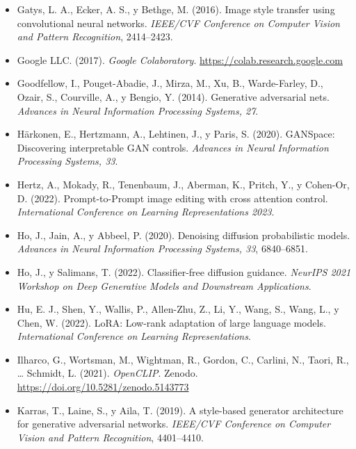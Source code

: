 \documentclass[12pt, a4paper, twoside]{book}
\begin{document}
\begin{itemize}[leftmargin=1.5em, itemsep=4pt]
\item Gatys, L. A., Ecker, A. S., y Bethge, M. (2016). Image style transfer using convolutional neural networks. \textit{IEEE/CVF Conference on Computer Vision and Pattern Recognition}, 2414--2423.

\item Google LLC. (2017). \textit{Google Colaboratory}. \url{https://colab.research.google.com}

\item Goodfellow, I., Pouget-Abadie, J., Mirza, M., Xu, B., Warde-Farley, D., Ozair, S., Courville, A., y Bengio, Y. (2014). Generative adversarial nets. \textit{Advances in Neural Information Processing Systems, 27}.

\item H{\"a}rkonen, E., Hertzmann, A., Lehtinen, J., y Paris, S. (2020). GANSpace: Discovering interpretable GAN controls. \textit{Advances in Neural Information Processing Systems, 33}.

\item Hertz, A., Mokady, R., Tenenbaum, J., Aberman, K., Pritch, Y., y Cohen-Or, D. (2022). Prompt-to-Prompt image editing with cross attention control. \textit{International Conference on Learning Representations 2023}.

\item Ho, J., Jain, A., y Abbeel, P. (2020). Denoising diffusion probabilistic models. \textit{Advances in Neural Information Processing Systems, 33}, 6840--6851.

\item Ho, J., y Salimans, T. (2022). Classifier-free diffusion guidance. \textit{NeurIPS 2021 Workshop on Deep Generative Models and Downstream Applications}.

\item Hu, E. J., Shen, Y., Wallis, P., Allen-Zhu, Z., Li, Y., Wang, S., Wang, L., y Chen, W. (2022). LoRA: Low-rank adaptation of large language models. \textit{International Conference on Learning Representations}.

\item Ilharco, G., Wortsman, M., Wightman, R., Gordon, C., Carlini, N., Taori, R., \ldots{} Schmidt, L. (2021). \textit{OpenCLIP}. Zenodo. \url{https://doi.org/10.5281/zenodo.5143773}

\item Karras, T., Laine, S., y Aila, T. (2019). A style-based generator architecture for generative adversarial networks. \textit{IEEE/CVF Conference on Computer Vision and Pattern Recognition}, 4401--4410.


\end{itemize}
\end{document}
